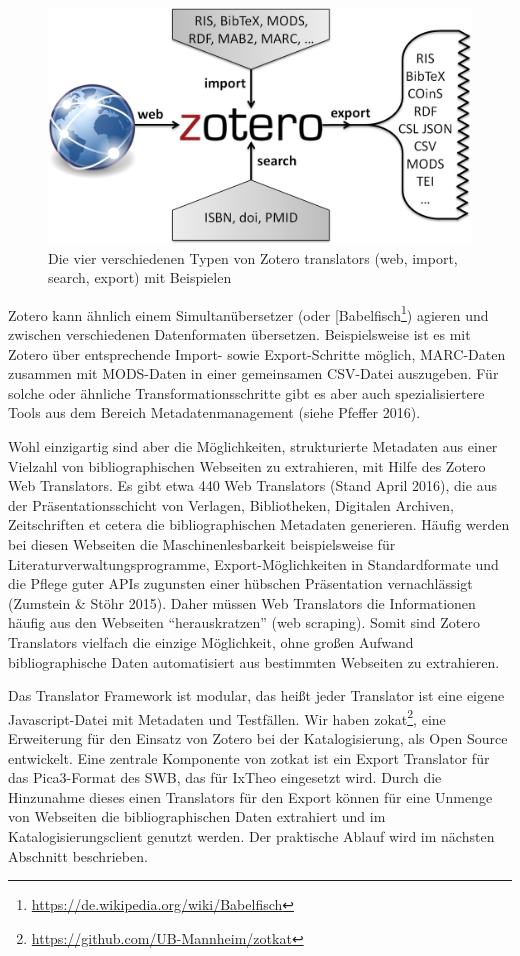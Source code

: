 \documentclass[a4paper,
fontsize=11pt,
oneside,
numbers=noperiodatend,
parskip=half-,
bibliography=totoc,
final
]{scrartcl}
\begin{document}
\begin{figure}[htbp]
\centering
\includegraphics{img/Zotero-Translators.jpg}
\caption{Die vier verschiedenen Typen von Zotero translators (web,
im\-port, search, export) mit Beispielen}
\end{figure}

Zotero kann ähnlich einem Simultanübersetzer (oder
{[}Babelfisch\footnote{\url{https://de.wikipedia.org/wiki/Babelfisch}})
agieren und zwischen verschiedenen Datenformaten übersetzen.
Beispielsweise ist es mit Zotero über entsprechende Im\-port- sowie
Export-Schritte möglich, MARC-Daten zusammen mit MODS-Daten in einer
gemeinsamen CSV-Datei auszugeben. Für solche oder ähnliche
Transformationsschritte gibt es aber auch spezialisiertere Tools aus dem
Bereich Metadatenmanagement (siehe Pfeffer 2016).

Wohl einzigartig sind aber die Möglichkeiten, strukturierte Metadaten
aus einer Vielzahl von bibliographischen Webseiten zu extrahieren, mit
Hilfe des Zotero Web Translators. Es gibt etwa 440 Web Translators
(Stand April 2016), die aus der Präsentationsschicht von Verlagen,
Bibliotheken, Digitalen Archiven, Zeitschriften et cetera die
bibliographischen Metadaten generieren. Häufig werden bei diesen
Webseiten die Maschinenlesbarkeit beispielsweise für
Literaturverwaltungsprogramme, Export-Möglichkeiten in Standardformate
und die Pflege guter APIs zugunsten einer hübschen Präsentation
vernachlässigt (Zumstein \& Stöhr 2015). Daher müssen Web Translators
die Informationen häufig aus den Webseiten \enquote{herauskratzen} (web
scraping). Somit sind Zotero Translators vielfach die einzige
Möglichkeit, ohne großen Aufwand bibliographische Daten automatisiert
aus bestimmten Webseiten zu extrahieren.

Das Translator Framework ist modular, das heißt jeder Translator ist
eine eigene Javascript-Datei mit Metadaten und Testfällen. Wir haben
zokat\footnote{\url{https://github.com/UB-Mannheim/zotkat}}, eine
Erweiterung für den Einsatz von Zotero bei der Katalogisierung, als Open
Source entwickelt. Eine zentrale Komponente von zotkat ist ein Export
Translator für das Pica3-Format des SWB, das für IxTheo eingesetzt wird.
Durch die Hinzunahme dieses einen Translators für den Export können für
eine Unmenge von Webseiten die bibliographischen Daten extrahiert und im
Katalogisierungsclient genutzt werden. Der praktische Ablauf wird im
nächsten Abschnitt beschrieben.
\end{document}
